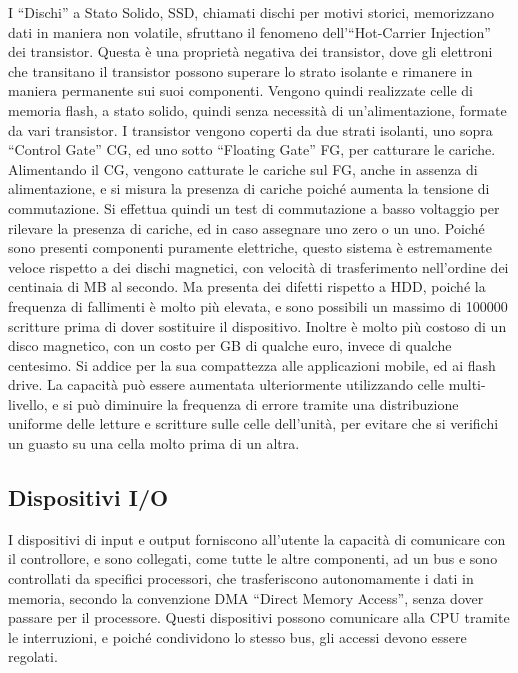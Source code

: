 \documentclass{article}
\numberwithin{equation}{subsection}
\begin{document}
I ``Dischi'' a Stato Solido, SSD, chiamati dischi per motivi storici, memorizzano dati in maniera non volatile, sfruttano il fenomeno dell'``Hot-Carrier Injection'' dei transistor. Questa è una proprietà 
negativa dei transistor, dove gli elettroni che transitano il transistor possono superare lo strato isolante e rimanere in maniera permanente sui suoi componenti. 
Vengono quindi realizzate celle di memoria flash, a stato solido, quindi senza necessità di un'alimentazione, formate da vari transistor. 
I transistor vengono coperti da due strati isolanti, uno sopra ``Control Gate'' CG, ed uno sotto ``Floating Gate'' FG, per catturare le cariche. Alimentando il CG, vengono catturate le cariche sul FG, anche in assenza 
di alimentazione, e si misura la presenza di cariche poiché aumenta la tensione di commutazione. Si effettua quindi un test di commutazione a basso voltaggio per rilevare la presenza di cariche, ed in caso 
assegnare uno zero o un uno. 
Poiché sono presenti componenti puramente elettriche, questo sistema è estremamente veloce rispetto a dei dischi magnetici, con velocità di trasferimento nell'ordine dei centinaia di MB al secondo. Ma presenta dei 
difetti rispetto a HDD, poiché la frequenza di fallimenti è molto più elevata, e sono possibili un massimo di 100000 scritture prima di dover sostituire il dispositivo. 
Inoltre è molto più costoso di un disco magnetico, con un costo per GB di qualche euro, invece di qualche centesimo. Si addice per la sua compattezza alle applicazioni mobile, ed ai flash drive. La capacità può 
essere aumentata ulteriormente utilizzando celle multi-livello, e si può diminuire la frequenza di errore tramite una distribuzione uniforme delle letture e scritture sulle celle dell'unità, per evitare che si 
verifichi un guasto su una cella molto prima di un altra. 

\subsection{Dispositivi I/O}

I dispositivi di input e output forniscono all'utente la capacità di comunicare con il controllore, e sono collegati, come tutte le altre componenti, ad un bus e sono controllati da specifici processori, che 
trasferiscono autonomamente i dati in memoria, secondo la convenzione DMA ``Direct Memory Access'', senza dover passare per il processore. Questi dispositivi possono comunicare alla CPU tramite le interruzioni, e 
poiché condividono lo stesso bus, gli accessi devono essere regolati. 
\end{document}
